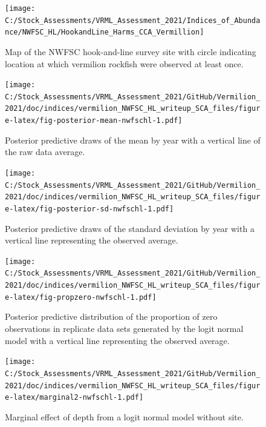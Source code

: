 \documentclass[11pt,
  english,
  a4paper,
]{article}
\begin{document}
\FloatBarrier

\begin{figure}
\texttt{[image: C:/Stock\_Assessments/VRML\_Assessment\_2021/Indices\_of\_Abundance/NWFSC\_HL/HookandLine\_Harms\_CCA\_Vermillion]} \caption{Map of the NWFSC hook-and-line survey site with circle indicating location at which vermilion rockfish were observed at least once.}\label{fig:spp-sites}
\end{figure}

\FloatBarrier

\begin{figure}
\centering
\texttt{[image: C:/Stock\_Assessments/VRML\_Assessment\_2021/GitHub/Vermilion\_2021/doc/indices/vermilion\_NWFSC\_HL\_writeup\_SCA\_files/figure-latex/fig-posterior-mean-nwfschl-1.pdf]}
\caption{\label{fig:fig-posterior-mean-nwfschl}Posterior predictive draws of the mean by year with a vertical line of the raw data average.}
\end{figure}

\FloatBarrier

\begin{figure}
\centering
\texttt{[image: C:/Stock\_Assessments/VRML\_Assessment\_2021/GitHub/Vermilion\_2021/doc/indices/vermilion\_NWFSC\_HL\_writeup\_SCA\_files/figure-latex/fig-posterior-sd-nwfschl-1.pdf]}
\caption{\label{fig:fig-posterior-sd-nwfschl}Posterior predictive draws of the standard deviation by year with a vertical line representing the observed average.}
\end{figure}

\begin{figure}
\centering
\texttt{[image: C:/Stock\_Assessments/VRML\_Assessment\_2021/GitHub/Vermilion\_2021/doc/indices/vermilion\_NWFSC\_HL\_writeup\_SCA\_files/figure-latex/fig-propzero-nwfschl-1.pdf]}
\caption{\label{fig:fig-propzero-nwfschl}Posterior predictive distribution of the proportion of zero observations in replicate data sets generated by the logit normal model with a vertical line representing the observed average.}
\end{figure}

\begin{figure}
\centering
\texttt{[image: C:/Stock\_Assessments/VRML\_Assessment\_2021/GitHub/Vermilion\_2021/doc/indices/vermilion\_NWFSC\_HL\_writeup\_SCA\_files/figure-latex/marginal2-nwfschl-1.pdf]}
\caption{\label{fig:marginal2-nwfschl}Marginal effect of depth from a logit normal model without site.}
\end{figure}
\end{document}
